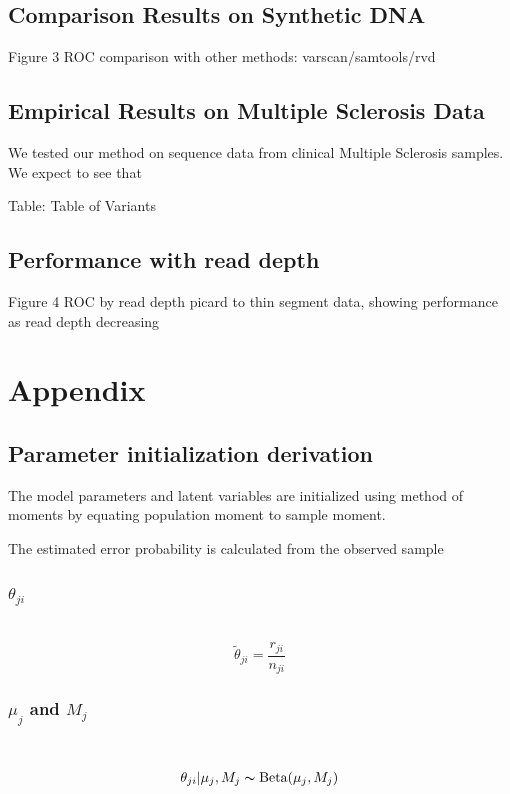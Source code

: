 \documentclass[11pt,reqno]{amsart}
\begin{document}
\subsection{Comparison Results on Synthetic DNA}
Figure 3 ROC comparison with other methods: varscan/samtools/rvd
\subsection{Empirical Results on Multiple Sclerosis Data}
We tested our method on sequence data from clinical Multiple Sclerosis samples. We expect to see that 

Table: Table of Variants
\subsection{Performance with read depth}
Figure 4 ROC by read depth
picard to thin segment data, showing performance as read depth decreasing

\section{Appendix}
\subsection{Parameter initialization derivation}
The model parameters and latent variables are initialized using method of moments by equating population moment to sample moment. 

The estimated error probability is calculated from the observed sample
\subsubsection{$\theta_{ji}$}\
\begin{equation}
 \tilde{\theta}_{ji}=\frac{r_{ji}}{n_{ji}}
\end{equation}

\subsubsection{$\mu_j$ and $M_j$}\
\begin{align}
 \theta_{ji}|\mu_j,M_j\thicksim \text{Beta}(\mu_j,M_j)
\end{align}
\end{document}
